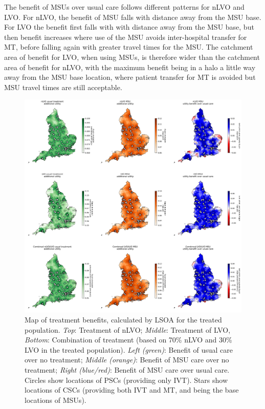 The benefit of MSUs over usual care follows different patterns for nLVO and LVO. For nLVO, the benefit of MSU falls with distance away from the MSU base. For LVO the benefit first falls with with distance away from the MSU base, but then benefit increases where use of the MSU avoids inter-hospital transfer for MT, before falling again with greater travel times for the MSU. The catchment area of benefit for LVO, when using MSUs, is therefore wider than the catchment area of benefit for nLVO, with the maximum benefit being in a halo a little way away from the MSU base location, where patient transfer for MT is avoided but MSU travel times are still acceptable.


\begin{figure}[h!]
    \centering
    \includegraphics[width=1\linewidth]{images/map_utility.jpg}
    \caption{Map of treatment benefits, calculated by LSOA for the treated population. \textit{Top}: Treatment of nLVO; \textit{Middle}: Treatment of LVO, \textit{Bottom}: Combination of treatment (based on 70\% nLVO and 30\% LVO in the treated population). \textit{Left (green)}: Benefit of usual care over no treatment; \textit{Middle (orange)}: Benefit of MSU care over no treatment; \textit{Right (blue/red)}: Benefit of MSU care over usual care. Circles show locations of PSCs (providing only IVT). Stars show locations of CSCs (providing both IVT and MT, and being the base locations of MSUs).}
    \label{fig:msu_map_utility}
\end{figure}

